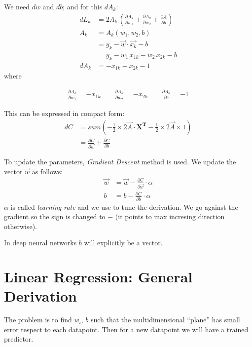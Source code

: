 We need $dw$ and $db$; and for this $dA_k$:
\begin{align*}
  dL_k  &= 2A_k\,(\frac{\partial A_k}{\partial w_1} + \frac{\partial A_k}{\partial w_2} + \frac{\partial A}{\partial b}) \\
  A_k &= A_k(w_1, w_2, b)\\
  &= y_k - \vec{w}\cdot{}\vec{x_k} - b\\
  &= y_k - w_1\,x_{1k} - w_2\,x_{2k}-b\\
  dA_k &= -x_{1k} - x_{2k} -1
\end{align*}
where 
\begin{center}
\begin{align*}
  \frac{\partial A_{k}}{\partial w_1} = -x_{1k}\hspace{2em} \frac{\partial A_{k}}{\partial w_2} = -x_{2k}\hspace{2em} \frac{\partial A_k}{\partial b} = -1
\end{align*} 
\end{center}

This can be expressed in compact form:
\begin{align}
  dC &= sum(-\frac{1}{2}\times{}2\vec{A}\cdot{}\mathbf{X^T} -\frac{1}{2}\times{}2\vec{A}\times{}1)\\
  &= \frac{\partial C}{\partial \vec{w}} + \frac{\partial C}{\partial b}  \nonumber
\end{align}

To update the parameters, \textit{Gradient Descent} method is used. We update the vector $\vec{w}$ as follows:
\begin{align}
  \vec{w} &= \vec{w} -\frac{\partial C}{\partial \vec{w}}\cdot{}\alpha\\
  b &= b -\frac{\partial C}{\partial b}\cdot{}\alpha
\end{align}
$\alpha$ is called \textit{learning rate} and we use to tune the derivation. We go against the gradient so the sign is changed to $-$ (it points to max incresing direction otherwise).

In deep neural networks $b$ will explicitly be a vector.




\section{Linear Regression: General Derivation}
The problem is to find $w_i$, $b$ such that the multidimensional ``plane'' has small error respect to each datapoint. Then for a new datapoint we will have a trained predictor.

